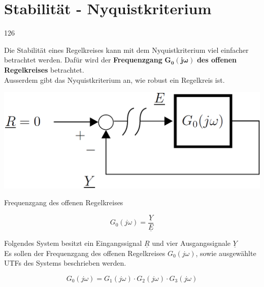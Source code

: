 \section{Stabilität - Nyquistkriterium}{126}
\label{offener Regelkreis}

Die Stabilität eines Regelkreises kann mit dem Nyquistkriterium viel einfacher betrachtet werden. Dafür wird der \textbf{Frequenzgang}
$\boldsymbol{G_0(j \omega)}$ \textbf{des offenen Regelkreises} betrachtet. \\
Ausserdem gibt das Nyquistkriterium an, wie robust ein Regelkreis ist. \\

\begin{minipage}[c]{0.48\columnwidth}
    \includegraphics[width=\columnwidth]{images/offener_regelkreis.png}
\end{minipage}
\hfill
\begin{minipage}[c]{0.48\columnwidth}
    \begin{center}
        Frequenzgang des offenen Regelkreises
    \end{center}
    $$ \boxed{ G_0(j \omega) = \frac{\underline{Y}}{\underline{E}} } $$
\end{minipage}



\label{Kreisschaltung mehrere Bloecke}

Folgendes System besitzt ein Eingangssignal $\underline{R}$ und vier Ausgangssignale $\underline{Y}$\\
Es sollen der Frequenzgang des offenen Regelkreises $G_0(j \omega)$, sowie ausgewählte UTFs des Systems beschrieben werden.

$$ G_0(j \omega) = G_1(j \omega) \cdot G_2(j \omega) \cdot G_3(j \omega)  $$

